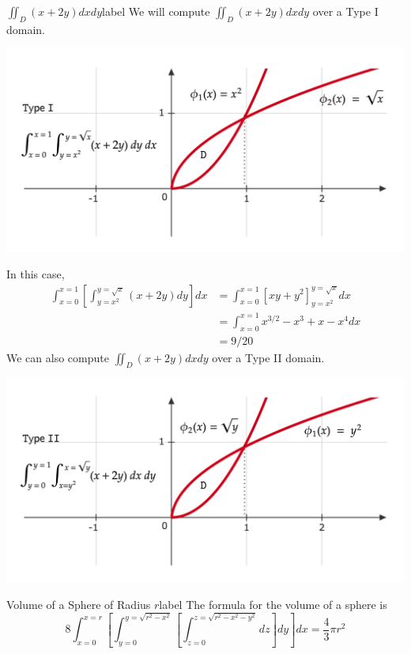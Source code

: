 \begin{ex}{$\iint_D(x+2 y) d x d y$}{label}
	We will compute $\iint_D(x+2 y) d x d y$ over a Type I domain.
	\begin{center}
    \includegraphics[width=\linewidth]{figures/wk-6/fig-8.png}
    \end{center}
    In this case,
    \begin{align*}
    	\int_{x=0}^{x=1}\left[\int_{y=x^2}^{y=\sqrt{x}}(x+2 y) d y\right] d x
    	&=\int_{x=0}^{x=1}\left[x y+y^2\right]_{y=x^2}^{y=\sqrt{x}} d x \\
    	&= \int_{x=0}^{x=1} x^{3 / 2}-x^3+x-x^4 d x \\
    	&= 9/20
    \end{align*}
    We can also compute $\iint_D(x+2 y) d x d y$ over a Type II domain.
    \begin{center}
    \includegraphics[width=\linewidth]{figures/wk-6/fig-9.png}
    \end{center}
\end{ex}

\begin{ex}{Volume of a Sphere of Radius $r$}{label}
	The formula for the volume of a sphere is
	\[8 \int_{x=0}^{x=r}\left[\int_{y=0}^{y=\sqrt{r^2-x^2}}\left[\int_{z=0}^{z=\sqrt{r^2-x^2-y^2}} d z\right] d y\right] d x = \frac{4}{3} \pi r^2\]
\end{ex}

